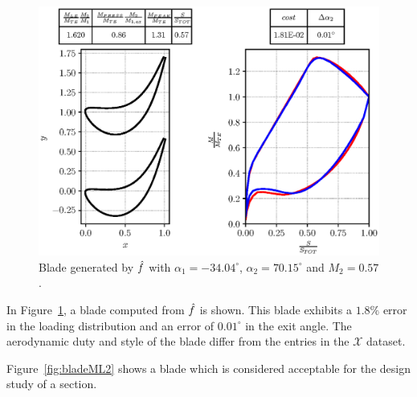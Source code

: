\begin{figure}[H]
    \centering 
    \includegraphics[scale=\scaleBlade]{./images/blade--3404-7015-57.eps}
    \caption{Blade generated by $\hat{\mathnormal{f}}$ with $\alpha_1 = -34.04^{\circ}$, $\alpha_2 = 70.15^{\circ}$ and $M_2 = 0.57$.}
    \label{fig:bladeML1}
\end{figure}


In Figure~\ref{fig:bladeML1}, a blade computed from $\hat{\mathnormal{f}}$ is shown. This blade exhibits a $1.8\%$ error 
in the loading distribution and an error of $0.01^{\circ}$ in the exit angle. The aerodynamic duty and style of the 
blade differ from the entries in the $\mathcal{X}$ dataset.

Figure~\ref{fig:bladeML2} shows a blade which is considered acceptable for the design study of a section.

